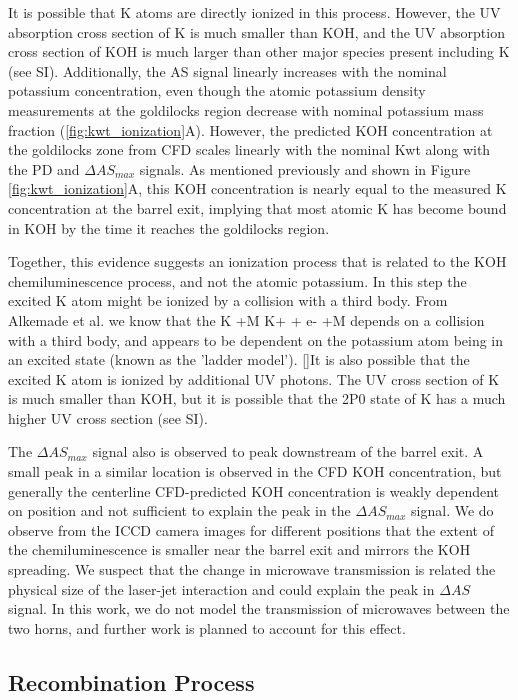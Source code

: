 It is possible that K atoms are directly ionized in this process. However, the UV absorption cross section of K is much smaller than KOH, and the UV absorption cross section of KOH is much larger than other major species present including K (see SI). Additionally, the AS signal linearly increases with the nominal potassium concentration, even though the atomic potassium density measurements at the goldilocks region decrease with nominal potassium mass fraction (\ref{fig:kwt_ionization}A). However, the predicted KOH concentration at the goldilocks zone from CFD scales linearly with the nominal Kwt along with the PD and $\Delta AS_{max}$ signals. As mentioned previously and shown in Figure \ref{fig:kwt_ionization}A, this KOH concentration is nearly equal to the measured K concentration at the barrel exit, implying that most atomic K has become bound in KOH by the time it reaches the goldilocks region.

Together, this evidence suggests an ionization process that is related to the KOH chemiluminescence process, and not the atomic potassium. In this step the excited K atom might be ionized by a collision with a third body.  From Alkemade et al. we know that the K +M \rightarrow K+ + e- +M depends on a collision with a third body, and appears to be dependent on the potassium atom being in an excited state (known as the 'ladder model'). []It is also possible that the excited K atom is ionized by additional UV photons. The UV cross section of K is much smaller than KOH, but it is possible that the 2P0 state of K has a much higher UV cross section (see SI). 

The $\Delta AS_{max}$ signal also is observed to peak downstream of the barrel exit. A small peak in a similar location is observed in the CFD KOH concentration, but generally the centerline CFD-predicted KOH concentration is weakly dependent on position and not sufficient to explain the peak in the $\Delta AS_{max}$ signal. We do observe from the ICCD camera images for different positions that the extent of the chemiluminescence is smaller near the barrel exit and mirrors the KOH spreading. We suspect that the change in microwave transmission is related the physical size of the laser-jet interaction and could explain the peak in $\Delta AS$ signal. In this work, we do not model the transmission of microwaves between the two horns, and further work is planned to account for this effect.

\subsection{Recombination Process}

